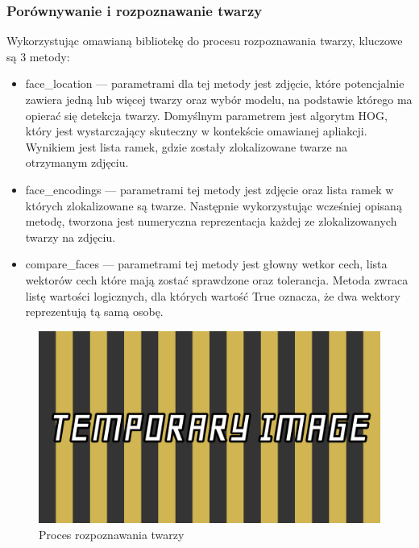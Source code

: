 \subsubsection{Porównywanie i rozpoznawanie twarzy}
Wykorzystując omawianą bibliotekę do procesu rozpoznawania twarzy, kluczowe są 3 metody:
\begin{itemize}
  \item {\selectfont face\_location } --- parametrami dla tej metody jest zdjęcie, które potencjalnie zawiera jedną lub więcej twarzy oraz wybór modelu, na podstawie którego ma opierać się detekcja twarzy. Domyślnym parametrem jest algorytm HOG, który jest wystarczający skuteczny w kontekście omawianej apliakcji. Wynikiem jest lista ramek, gdzie zostały zlokalizowane twarze na otrzymanym zdjęciu.
  \item {\selectfont face\_encodings } --- parametrami tej metody jest zdjęcie oraz lista ramek w których zlokalizowane są twarze. Następnie wykorzystując wcześniej opisaną metodę, tworzona jest numeryczna reprezentacja każdej ze zlokalizowanych twarzy na zdjęciu.
  \item {\selectfont compare\_faces } --- parametrami tej metody jest głowny wetkor cech, lista wektorów cech które mają zostać sprawdzone oraz tolerancja. Metoda zwraca listę wartości logicznych, dla których wartość True oznacza, że dwa wektory reprezentują tą samą osobę.

\end{itemize}


\begin{figure}[ht]
	\centering
		\includegraphics[width=0.6\linewidth]{imgs/temp.png}
	\caption{Proces rozpoznawania twarzy}
	\label{fig:proces-rozpoznawania}
\end{figure}

